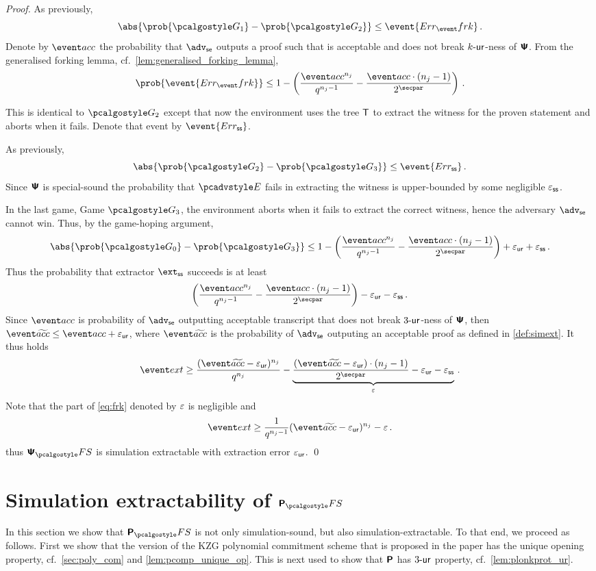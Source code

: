 \let\accentvec\vec \documentclass[runningheads,10pt]{llncs}
\begin{document}
\begin{proof}
	As previously, 
	\[
		\abs{\prob{\game{1}} - \prob{\game{2}}} \leq \event{\errfrk}\,.
	\]
	Denote by $\accProb$ the probability that $\advse$ outputs a proof such that is acceptable and does not break ${k\text{-}\mathsf{ur}}$-ness of $\bm{\mathsf{\Psi}}$. 
	From the generalised forking lemma, cf.~\cref{lem:generalised_forking_lemma}, 
	\[
		\prob{\event{\errfrk}} \leq 1 - \left(\frac{\accProb^{n_j}}{q^{n_j - 1}} - \frac{\accProb \cdot (n_j - 1)}{2^\secpar}\right)\,.
	\]
	
	This is identical to $\game{2}$ except that now the environment uses the tree $\mathsf{T}$ to extract the witness for the proven statement and aborts when it fails. Denote that event by $\event{\errss}$.
	
	As previously, 
	\[
		\abs{\prob{\game{2}} - \prob{\game{3}}} \leq \event{\errss}\,.
	\]
	Since $\bm{\mathsf{\Psi}}$ is special-sound the probability that $\env$ fails in extracting the witness is upper-bounded by some negligible $\varepsilon_{\mathsf{ss}}$.
	
	In the last game, Game $\game{3}$, the environment aborts when it fails to extract the correct witness, hence the adversary $\advse$ cannot win. 
	Thus, by the game-hoping argument, 
	\[
		\abs{\prob{\game{0}} - \prob{\game{3}}} \leq 1 - \left(\frac{\accProb^{n_j}}{q^{n_j - 1}} - \frac{\accProb \cdot (n_j - 1)}{2^\secpar}\right) + \epsur + \epsss\,.
	\]
	Thus the probability that extractor $\extss$ succeeds is at least
	\[
		\left(\frac{\accProb^{n_j}}{q^{n_j - 1}} - \frac{\accProb \cdot (n_j - 1)}{2^\secpar}\right) - \epsur - \epsss\,.
	\]
	Since $\accProb$ is probability of $\advse$ outputting acceptable transcript that does not break ${3\text{-}\mathsf{ur}}$-ness of $\bm{\mathsf{\Psi}}$, then $\waccProb \leq \accProb + \epsur$, where $\waccProb$ is the probability of $\advse$ outputing an acceptable proof as defined in \cref{def:simext}. It thus holds
	\[
 		\label{eq:frk}
 		\extProb \geq \frac{(\waccProb - \epsur)^{n_j}}{q^{n_j}} - \underbrace{\frac{(\waccProb - \epsur) \cdot (n_j - 1)}{2^\secpar} - \epsur - \epsss}_{\eps}\,.
 	\]
 	Note that the part of \cref{eq:frk} denoted by $\varepsilon$ is negligible and 
 	\[
 		\extProb \geq \frac{1}{q^{n_j - 1}} (\waccProb - \epsur)^{n_j} -\eps\,.
 	\] 
 	thus
 	$\psfs$ is simulation extractable with extraction error $\varepsilon_{\mathsf{ur}}$.
 	\qed
\end{proof}

\section{Simulation extractability of $\plonkprotfs$} 
In this section we show that $\plonkprotfs$
is not only simulation-sound, but also simulation-extractable. To that end, we
proceed as follows. 
First we show that the version of the KZG polynomial commitment scheme that is proposed in the \plonk{} paper has the unique opening property, cf.~\cref{sec:poly_com} and \cref{lem:pcomp_unique_op}. This is next used to show that $\bm{\mathsf{P}}$ has ${3\text{-}\mathsf{ur}}$ property, cf.~\cref{lem:plonkprot_ur}.
\end{document}
